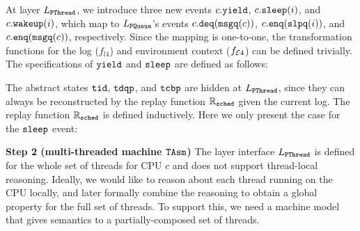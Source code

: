{At layer $L_\pthread$, we introduce three new events
$c.\yield$, $c.\sleep(i)$, and $c.\wakeup(i)$,
which map to $L_\pqueue$'s events
$c.\deq(\comm{msgq}(c))$,
$c.\enq(\comm{slpq}(i))$,
and $c.\enq(\comm{msgq}(c))$, respectively.
Since the mapping is one-to-one, the transformation functions for
the log ($f_{l4}$) and environment context ($f_{\oracle4}$)
can be defined trivially.
The specifications of $\yield$ and $\sleep$
are defined as follows:
\begin{mathpar}
\end{mathpar}%
The abstract states $\comm{tid}$,
$\comm{tdqp}$, and $\comm{tcbp}$
are hidden at $L_\pthread$, since they can always be reconstructed
by the replay function $\replay_{\comm{sched}}$ given the current log.
The replay function $\replay_{\comm{sched}}$
is defined inductively.
Here we only present the case for the $\sleep$ event:
\begin{mathpar}
\end{mathpar}%
\noindent\textbf{Step 2 (multi-threaded machine $\TAsm$)} 
The  layer interface $L_\pthread$ is defined for the whole
set of threads for CPU $c$ and does not support thread-local reasoning.
Ideally, we would like to reason about each thread running on the CPU 
locally, and later formally combine the reasoning to obtain a global
property for the full set of threads.
To support this, we need a machine model that gives semantics to
a partially-composed set of threads.

}
